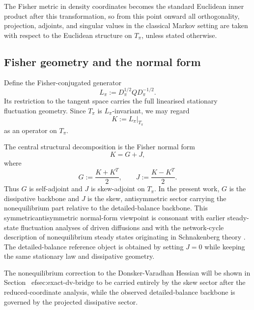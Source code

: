 \documentclass[11pt,a4paper]{article}
\numberwithin{equation}{section}
\theoremstyle{thmcompact}
\theoremstyle{remark}
\begin{document}
The Fisher metric in density coordinates becomes the standard Euclidean inner product after this transformation, so from this point onward all orthogonality, projection, adjoints, and singular values in the classical Markov setting are taken with respect to the Euclidean structure on \(T_\pi\), unless stated otherwise.

\subsection{Fisher geometry and the normal form}

Define the Fisher-conjugated generator
\begin{equation}
L_\pi:=D_\pi^{1/2} Q D_\pi^{-1/2}.
\end{equation}
Its restriction to the tangent space carries the full linearised stationary fluctuation geometry. Since \(T_\pi\) is \(L_\pi\)-invariant, we may regard
\begin{equation}
K:=L_\pi|_{T_\pi}
\end{equation}
as an operator on \(T_\pi\).

The central structural decomposition is the Fisher normal form
\begin{equation}
K=G+J,
\end{equation}
where
\begin{equation}
G:=\frac{K+K^T}{2},
\qquad
J:=\frac{K-K^T}{2}.
\end{equation}
Thus \(G\) is self-adjoint and \(J\) is skew-adjoint on \(T_\pi\). In the present work, \(G\) is the dissipative backbone and \(J\) is the skew, antisymmetric sector carrying the nonequilibrium part relative to the detailed-balance backbone. This symmetric\/antisymmetric normal-form viewpoint is consonant with earlier steady-state fluctuation analyses of driven diffusions \cite{MaesNetocnyWynants2008} and with the network-cycle description of nonequilibrium steady states originating in Schnakenberg theory \cite{Schnakenberg1976}. The detailed-balance reference object is obtained by setting \(J=0\) while keeping the same stationary law and dissipative geometry.

The nonequilibrium correction to the Donsker-Varadhan Hessian will be shown in Section~
ef{sec:exact-dv-bridge} to be carried entirely by the skew sector after the reduced-coordinate analysis, while the observed detailed-balance backbone is governed by the projected dissipative sector.
\end{document}
